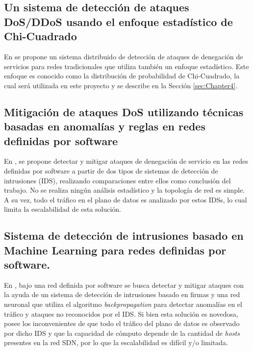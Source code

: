\subsection*{Un sistema de detección de ataques DoS/DDoS usando el enfoque estadístico de Chi-Cuadrado}
En \parencite{estado_arte_3} se propone un sistema distribuido de detección de ataques de denegación de servicios para redes tradicionales que utiliza también un enfoque estadístico. Este enfoque es conocido como la distribución de probabilidad de Chi-Cuadrado, la cual será utilizada en este proyecto y se describe en la Sección \ref{sec:Chapter4}.

\subsection*{Mitigación de ataques DoS utilizando técnicas basadas en anomalías y reglas en redes definidas por software}
En \parencite{estado_arte_4}, se propone detectar y mitigar ataques de denegación de servicio en las redes definidas por software a partir de dos tipos de sistemas de detección de intrusiones (IDS), realizando comparaciones entre ellos como conclusión del trabajo. No se realiza ningún análisis estadístico y la topología de red es simple. A su vez, todo el tráfico en el plano de datos es analizado por estos IDSs, lo cual limita la escalabilidad de esta solución.


\subsection*{Sistema de detección de intrusiones basado en Machine Learning para redes definidas por software.}
En \parencite{estado_arte_5}, bajo una red definida por software se busca
detectar y mitigar ataques con la ayuda de un sistema de detección de
intrusiones basado en firmas y una red neuronal que utiliza el algoritmo
\textit{backpropagation} para detectar anomalías en el tráfico y ataques no
reconocidos por el IDS. Si bien esta solución es novedosa, posee los
inconvenientes de que todo el tráfico del plano de datos es observado por dicho
IDS y que la capacidad de cómputo depende de la cantidad de \textit{hosts}
presentes en la red SDN, por lo que la escalabilidad es difícil y/o limitada.
